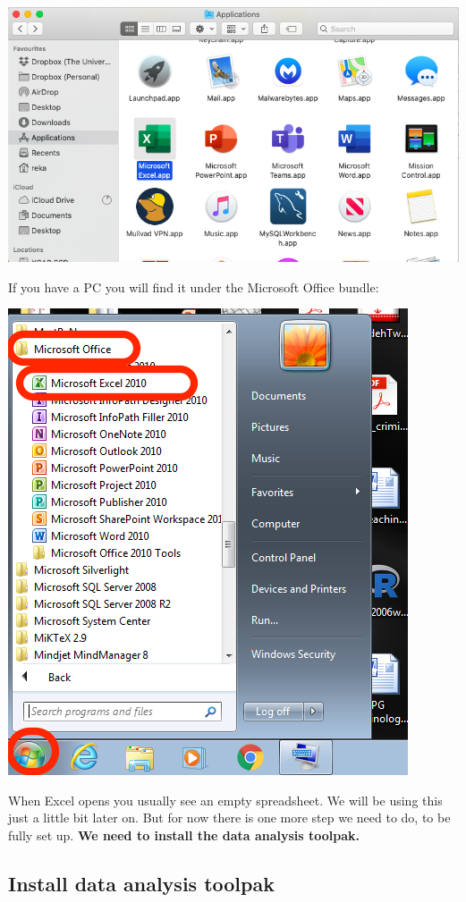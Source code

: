 \documentclass[
]{book}
\begin{document}
\includegraphics{imgs/finder_excel.png}

If you have a PC you will find it under the Microsoft Office bundle:

\includegraphics{imgs/open_excel.png}

When Excel opens you usually see an empty spreadsheet. We will be using this just a little bit later on. But for now there is one more step we need to do, to be fully set up. \textbf{We need to install the data analysis toolpak.}

\hypertarget{install-data-analysis-toolpak}{%
\subsection{Install data analysis toolpak}\label{install-data-analysis-toolpak}}
\end{document}
